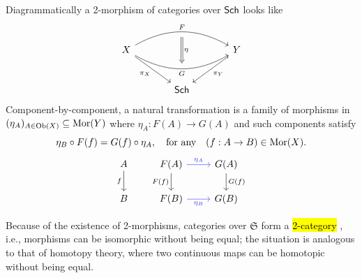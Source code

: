 \documentclass[12pt]{memoir}
\makeatletter
\newcommand{\roundedhighlight}[1]{%
  \begingroup
  \setuloverlap{2pt}%
  \def\SOUL@ulunderline##1{{%
    \setbox\z@\hbox{##1}%
    \rlap{\SOUL@ulcolor{\tikz[overlay,blend mode=darken]{%
      \fill[rounded corners=2pt]
        (-\SOUL@uloverlap,-\SOUL@uldp)
        rectangle (\dimexpr\wd\z@+\SOUL@uloverlap\relax,\SOUL@ulht);%
    }}}%
    \unhcopy\z@
  }}%
  \hl{#1}%
  \endgroup
}
\DeclareRobustCommand{\hlgreen}[1]{{\sethlcolor{notegreen}\roundedhighlight{#1}}}
\makeatother
\begin{document}
\begin{ptcb}
    Diagrammatically a 2-morphism of categories over \(\mathsf{Sch}\) looks like 
    \[
    \begin{tikzcd}[column sep=large, row sep=large]
        X
        \arrow[rr, bend left=30, "F"{name=F}]
        \arrow[rr, bend right=30, "G"'{name=G}]
        \arrow[dr, "\pi_X"']
        && Y \arrow[dl, "\pi_Y"] \\
        & \Sch
        \arrow[Rightarrow, from=F, to=G, shorten <=2mm, shorten >=2mm, "\eta"]
    \end{tikzcd}
    \]
    Component-by-component, a natural transformation is a family of morphisms in \((\eta_A)_{A\in\operatorname{Ob}(X)}\subseteq\operatorname{Mor}(Y)\) where
    \(\eta_A:F(A)\to G(A)\) and such components satisfy 
    \[
        \eta_B\circ F(f)=G(f)\circ\eta_A,\quad\text{for any}\quad(f:A\to B)\in\operatorname{Mor}(X).
    \]
    \[
    \begin{tikzcd}
        A \arrow[d, "f"']
        & F(A) \arrow[d, "F(f)"'] \arrow[r, blue!80, "\eta_A"]
        & G(A) \arrow[d, "G(f)"] \\
        B
        & F(B) \arrow[r, blue!80, "\eta_B"']
        & G(B)
    \end{tikzcd}
    \]
\end{ptcb}


Because of the existence of 2-morphisms, categories over $\mathfrak{S}$ form a \hlgreen{2-category}, i.e., morphisms can be isomorphic without being equal; the situation is analogous to that of homotopy theory, where two continuous maps can be homotopic without being equal.
\end{document}
